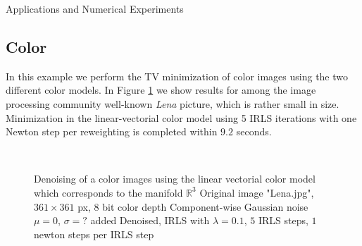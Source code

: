 \begin{chapter}{Applications and Numerical Experiments}
\FloatBarrier
\subsection{Color} %
\label{sub:Color}
In this example we perform the TV minimization of color images using the two different color models. In Figure \ref{fig:application_color1} we show results for among the image processing community well-known \emph{Lena} picture, which is rather small in size. Minimization in
the linear-vectorial color model using 5 IRLS iterations with one Newton step per reweighting is completed within $9.2$ seconds.\\

\begin{figure}[h!]
    \centering
    \\
    \caption[Color image "Lena" linear vectorial denoising]{Denoising of a color images using the linear vectorial color model which corresponds to the manifold $\mathbb{R}^3$
	 Original image "Lena.jpg", $361\times 361$ px, 8 bit color depth
	 Component-wise Gaussian noise $\mu=0$, $\sigma=?$ added
	 Denoised, IRLS with $\lambda=0.1$, $5$ IRLS steps, $1$ newton steps per IRLS step
	\label{fig:application_color1}
    }
\end{figure}


\end{chapter}
